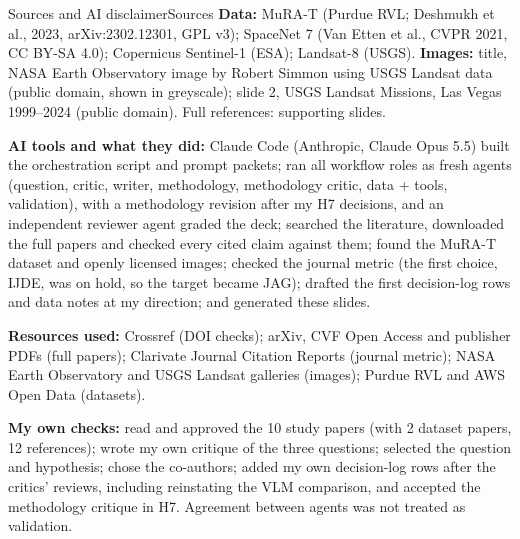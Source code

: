 \documentclass[aspectratio=169,11pt]{beamer}
\newcommand{\graticule}{%
  \foreach \x in {0,1.6,...,16.4} \draw[white,opacity=0.06,line width=0.4pt] ([xshift=\x cm]current page.south west) -- ([xshift=\x cm]current page.north west);
  \foreach \y in {0,1.6,...,9.6} \draw[white,opacity=0.06,line width=0.4pt] ([yshift=\y cm]current page.south west) -- ([yshift=\y cm]current page.south east);}
\begin{document}
\begin{frame}[shrink=18]{Sources and AI disclaimer}{Sources}
\footnotesize
\textbf{Data:} MuRA-T (Purdue RVL; Deshmukh et al., 2023, arXiv:2302.12301, GPL v3); SpaceNet 7 (Van Etten et al., CVPR 2021, CC BY-SA 4.0); Copernicus Sentinel-1 (ESA); Landsat-8 (USGS). \textbf{Images:} title, NASA Earth Observatory image by Robert Simmon using USGS Landsat data (public domain, shown in greyscale); slide 2, USGS Landsat Missions, Las Vegas 1999--2024 (public domain). Full references: supporting slides.

\vspace{6pt}
\textbf{AI tools and what they did:} Claude Code (Anthropic, Claude Opus 5.5) built the orchestration script and prompt packets; ran all workflow roles as fresh agents (question, critic, writer, methodology, methodology critic, data + tools, validation), with a methodology revision after my H7 decisions, and an independent reviewer agent graded the deck; searched the literature, downloaded the full papers and checked every cited claim against them; found the MuRA-T dataset and openly licensed images; checked the journal metric (the first choice, IJDE, was on hold, so the target became JAG); drafted the first decision-log rows and data notes at my direction; and generated these slides.

\vspace{4pt}
\textbf{Resources used:} Crossref (DOI checks); arXiv, CVF Open Access and publisher PDFs (full papers); Clarivate Journal Citation Reports (journal metric); NASA Earth Observatory and USGS Landsat galleries (images); Purdue RVL and AWS Open Data (datasets).

\vspace{6pt}
\textbf{My own checks:} read and approved the 10 study papers (with 2 dataset papers, 12 references); wrote my own critique of the three questions; selected the question and hypothesis; chose the co-authors; added my own decision-log rows after the critics' reviews, including reinstating the VLM comparison, and accepted the methodology critique in H7. Agreement between agents was not treated as validation.
\end{frame}

\begin{frame}[plain]
\end{frame}
\end{document}
